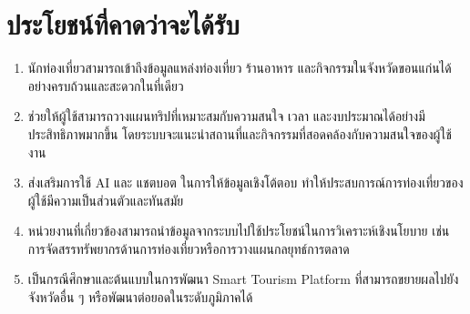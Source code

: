 \section{ประโยชน์ที่คาดว่าจะได้รับ}

\begin{enumerate}[label=\arabic*)]
    \item นักท่องเที่ยวสามารถเข้าถึงข้อมูลแหล่งท่องเที่ยว ร้านอาหาร และกิจกรรมในจังหวัดขอนแก่นได้อย่างครบถ้วนและสะดวกในที่เดียว
    \item ช่วยให้ผู้ใช้สามารถวางแผนทริปที่เหมาะสมกับความสนใจ เวลา และงบประมาณได้อย่างมีประสิทธิภาพมากขึ้น โดยระบบจะแนะนำสถานที่และกิจกรรมที่สอดคล้องกับความสนใจของผู้ใช้งาน
    \item ส่งเสริมการใช้ AI และ แชตบอต ในการให้ข้อมูลเชิงโต้ตอบ ทำให้ประสบการณ์การท่องเที่ยวของผู้ใช้มีความเป็นส่วนตัวและทันสมัย
    \item หน่วยงานที่เกี่ยวข้องสามารถนำข้อมูลจากระบบไปใช้ประโยชน์ในการวิเคราะห์เชิงนโยบาย เช่น การจัดสรรทรัพยากรด้านการท่องเที่ยวหรือการวางแผนกลยุทธ์การตลาด
    \item เป็นกรณีศึกษาและต้นแบบในการพัฒนา Smart Tourism Platform ที่สามารถขยายผลไปยังจังหวัดอื่น ๆ หรือพัฒนาต่อยอดในระดับภูมิภาคได้
\end{enumerate}
